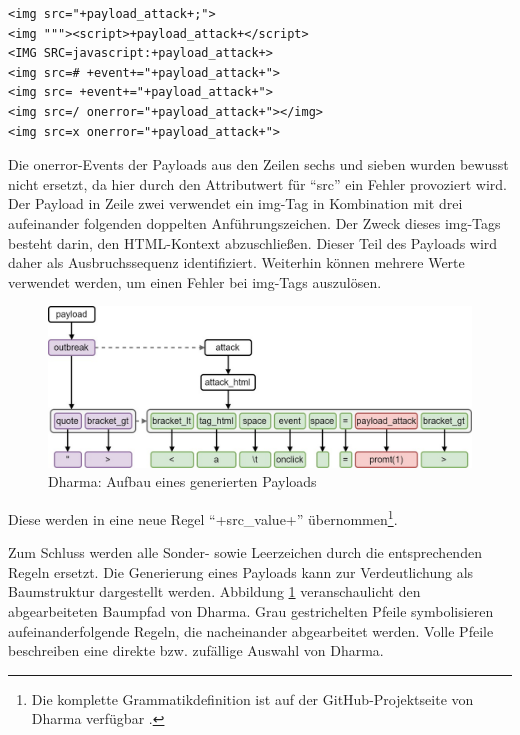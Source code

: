 \begin{lstlisting}[caption={Dharma: Umwandlung gegebener Payloads - Teil 2},label=lst:listofchangedpayloads]
<img src="+payload_attack+;">
<img """><script>+payload_attack+</script>
<IMG SRC=javascript:+payload_attack+>
<img src=# +event+="+payload_attack+">
<img src= +event+="+payload_attack+">
<img src=/ onerror="+payload_attack+"></img>
<img src=x onerror="+payload_attack+">
\end{lstlisting}

Die onerror-Events der Payloads aus den Zeilen sechs und sieben wurden bewusst nicht ersetzt, da hier durch den Attributwert für ``src'' ein Fehler provoziert wird. Der Payload in Zeile zwei verwendet ein img-Tag in Kombination mit drei aufeinander folgenden doppelten Anführungszeichen. Der Zweck dieses img-Tags besteht darin, den HTML-Kontext abzuschließen. Dieser Teil des Payloads wird daher als Ausbruchssequenz identifiziert. Weiterhin können mehrere Werte verwendet werden, um einen Fehler bei img-Tags auszulösen. 

\begin{figure}[htbp] 
	\centering
	\includegraphics[width=\textwidth]{contents/images/DharmaPayloadConstructionExample.jpg}
	\caption{Dharma: Aufbau eines generierten Payloads}
	\label{fig:dharmaPayloadConstructionExample}
\end{figure}

\FloatBarrier
Diese werden in eine neue Regel ``+src\_value+'' übernommen\footnote{Die komplette Grammatikdefinition ist auf der GitHub-Projektseite von Dharma verfügbar \cite{Borgardt2017}.}.

Zum Schluss werden alle Sonder- sowie Leerzeichen durch die entsprechenden Regeln ersetzt. Die Generierung eines Payloads kann zur Verdeutlichung als Baumstruktur dargestellt werden. Abbildung \ref{fig:dharmaPayloadConstructionExample} veranschaulicht den abgearbeiteten Baumpfad von Dharma. Grau gestrichelten Pfeile symbolisieren aufeinanderfolgende Regeln, die nacheinander abgearbeitet werden. Volle Pfeile beschreiben eine direkte bzw. zufällige Auswahl von Dharma.


